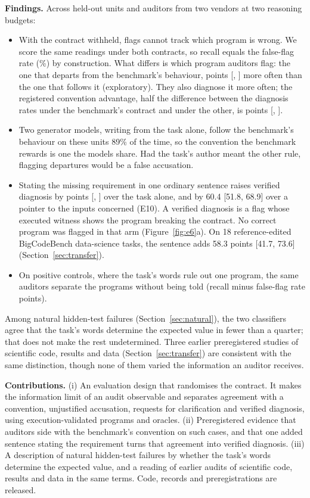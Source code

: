 \textbf{Findings.} Across \NSixUnits{} held-out units and auditors from two vendors at two reasoning budgets:
\begin{itemize}\itemsep1pt
\item With the contract withheld, flags cannot track which program is wrong. We score the same readings under
  both contracts, so recall equals the false-flag rate (\NSixNoneFlag\%) by construction. What differs is which
  program auditors flag: the one that departs from the benchmark's behaviour, \NSixFlagPref{} points
  [\NSixFlagPrefLo, \NSixFlagPrefHi] more often than the one that follows it (exploratory). They also diagnose it
  more often; the registered convention advantage, half the difference between the diagnosis rates under the
  benchmark's contract and under the other, is
  \NSixTwo{} points [\NSixTwoLo, \NSixTwoHi].
\item Two generator models, writing from the task alone, follow the benchmark's behaviour on these units 89\% of the
  time, so the convention the benchmark rewards is one the models share. Had the task's author meant the other rule,
  flagging departures would be a false accusation.
\item Stating the missing requirement in one ordinary sentence raises verified diagnosis by \NSixFive{} points
  [\NSixFiveLo, \NSixFiveHi] over the task alone, and by 60.4 [51.8, 68.9] over a pointer to the inputs concerned (E10). A
  verified diagnosis is a flag whose executed witness shows the program breaking the contract. No correct program
  was flagged in that arm (Figure~\ref{fig:e6}a). On 18 reference-edited BigCodeBench data-science tasks, the
  sentence adds 58.3 points [41.7, 73.6] (Section~\ref{sec:transfer}).
\item On positive controls, where the task's words rule out one program, the same auditors separate the programs
  without being told (recall minus false-flag rate \NSixFourJ{} points).
\end{itemize}
Among natural hidden-test failures (Section~\ref{sec:natural}), the two classifiers agree that the task's words
determine the expected value in fewer than a quarter; that does not make the rest undetermined. Three earlier
preregistered studies of scientific code, results and data (Section~\ref{sec:transfer}) are consistent with the same
distinction, though none of them varied the information an auditor receives.

\textbf{Contributions.} (i) An evaluation design that randomises the contract. It makes the information limit of an
audit observable and separates agreement with a convention, unjustified accusation, requests for clarification and
verified diagnosis, using execution-validated programs and oracles. (ii) Preregistered evidence that auditors side
with the benchmark's convention on such cases, and that one added sentence stating the requirement turns that
agreement into verified diagnosis. (iii) A description of natural hidden-test failures by whether the task's words
determine the expected value, and a reading of earlier audits of scientific code, results and data in the same terms.
Code, records and preregistrations are released.
